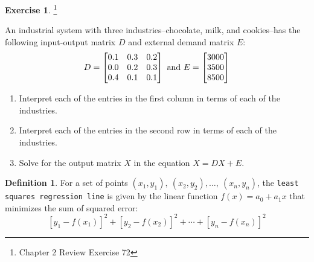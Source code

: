 \documentclass[handout]{beamer}
\newcommand{\blfootnote}[1]{%
	\begingroup
	\renewcommand\thefootnote{}\footnote{#1}%
	\addtocounter{footnote}{-1}%
	\endgroup
}
\newcommand{\fn}{\insertframenumber}
\theoremstyle{definition}
\newtheorem{exercise}{Exercise}
\newtheorem*{defn}{Definition}
\renewcommand{\emph}[1]{{\color{blue}\texttt{#1}}}
\begin{document}
\begin{frame}{\fn}
\begin{exercise}\blfootnote{Chapter 2 Review Exercise 72}
	An industrial system with three industries--chocolate, milk, and cookies--has the following input-output matrix $D$ and external demand matrix $E$:
	\[D=\begin{bmatrix}0.1&0.3&0.2\\0.0&0.2&0.3\\0.4&0.1&0.1\end{bmatrix}\textup{ and }E=\begin{bmatrix}3000\\3500\\8500\end{bmatrix}\]
	\begin{enumerate}[label=(\alph*)]
		\item Interpret each of the entries in the first column in terms of each of the industries.
		\item Interpret each of the entries in the second row in terms of each of the industries.
		\item Solve for the output matrix $X$ in the equation $X=DX+E$.
	\end{enumerate}
\end{exercise}
\end{frame}\begin{frame}{\fn}
\begin{defn}
	For a set of points $(x_1,y_1),\ (x_2,y_2),\dots,\ (x_n,y_n)$, the \emph{least squares regression line} is given by the linear function $f(x)=a_0+a_1x$ that minimizes the sum of squared error:
	\[[y_1-f(x_1)]^2+[y_2-f(x_2)]^2+\cdots+[y_n-f(x_n)]^2\]
\end{defn}
\end{frame}
\end{document}
